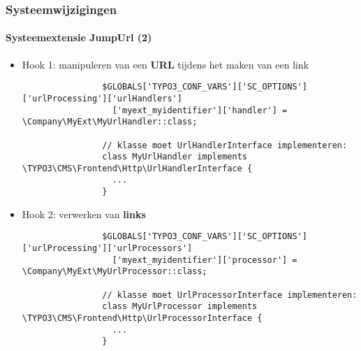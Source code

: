 
\begin{frame}[fragile]
	\frametitle{Systeemwijzigingen}
	\framesubtitle{Systeemextensie JumpUrl (2)}

	\lstset{basicstyle=\tiny\ttfamily}

	\begin{itemize}

		\item Hook 1: manipuleren van een \textbf{URL} tijdens het maken van een link

			\begin{lstlisting}
				$GLOBALS['TYPO3_CONF_VARS']['SC_OPTIONS']['urlProcessing']['urlHandlers']
				  ['myext_myidentifier']['handler'] = \Company\MyExt\MyUrlHandler::class;

				// klasse moet UrlHandlerInterface implementeren:
				class MyUrlHandler implements \TYPO3\CMS\Frontend\Http\UrlHandlerInterface {
				  ...
				}
			\end{lstlisting}

		\item Hook 2: verwerken van \textbf{links}

			\begin{lstlisting}
				$GLOBALS['TYPO3_CONF_VARS']['SC_OPTIONS']['urlProcessing']['urlProcessors']
				  ['myext_myidentifier']['processor'] = \Company\MyExt\MyUrlProcessor::class;

				// klasse moet UrlProcessorInterface implementeren:
				class MyUrlProcessor implements \TYPO3\CMS\Frontend\Http\UrlProcessorInterface {
				  ...
				}
			\end{lstlisting}

	\end{itemize}

\end{frame}


